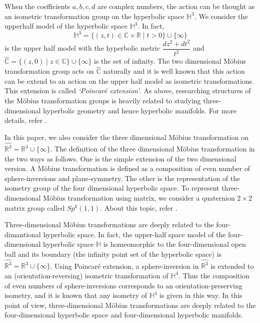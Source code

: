 When the coefficients $a, b, c, d$ are complex numbers, 
the action can be thought as an isometric transformation group on the hyperbolic space $\mathbb{H}^3$.
We consider the upperhalf model of the hyperbolic space $\mathbb{H}^3$.
In fact, 
\[\mathbb{H}^3 = \{ (z,t) \in \mathbb{C}\times \mathbb{R}\mid t>0 \} \cup \{\infty\} \]
is the upper half model with the hyperbolic metric $\dfrac{dz^2+dt^2}{t^2}$ and 
$\hat{\mathbb{C}} = \{ (z,0) \mid z \in \mathbb{C}\} \cup \{ \infty\}$
is the set of infinity. The two dimensional M\"obius transformation group acts on $\hat{\mathbb{C}}$
naturally and it is well known that this action can be extend to 
an action on the upper half model as isometric transformations.
This extension is called \textit{\lq Poincar\'e extension\rq}.
As above, researching structures of the M\"obius transformation groups is heavily
related to studying three-dimensional hyperbolic geometry and hence hyperbolic manifolds.
For more details, refer 
\cite{Marden200705outerCircles}\cite{taniguchi_okumura199610invitation}.

In this paper, we also consider the three dimensional M\"obius
transformation on $\hat{\mathbb{R}^3} = \mathbb{R}^3\cup\{\infty\}$.
The definition of the three dimensional M\"obius transformation in the two ways as follows.
One is the simple extension of the two dimensional version.
A M\"obius transformation is defined as a composition of even number of sphere-inversions 
and plane-symmetry.
The other is the representation of the isometry group of the four dimensional hyperbolic space.
To represent three-dimensional M\"obius transformation using matrix,
we consider a quaternion $2 \times 2$ matrix group called
$Sp^k(1,1)$. About this topic, refer
\cite{sakugawa2010limit}\cite{sakugawa2007master}.

Three-dimensional M\"obius transformations are deeply related to
the four-dimantional hyperbolic space. In fact, the upper-half space model of
the four-dimensional hyperbolic space $\mathbb{H}$ is homeomorphic to the 
four-dimensional open ball and its boundary (the infinity point set of the hyperbolic
space) is $\hat{\mathbb{R}^3} = \mathbb{R}^3\cup\{\infty\}$.
Using Poincar\'e extension, a sphere-inversion in $\hat{\mathbb{R}^3}$
is extended to an (orientation-reversing) isometric transformation of $\mathbb{H}^4$.
Thus the composition of even numbers of sphere-inversions corresponds to an orientation-preserving
isometry, and it is known that any isometry of $\mathbb{H}^4$ is given in this way.
In this point of view, three-dimensional M\"obius transformations are
deeply related to the four-dimensional hyperbolic space and four-dimensional hyperbolic manifolds.

